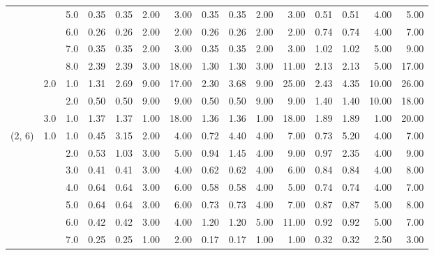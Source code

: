 \begin{tabular}{lllrrrrrrrrrrrr}
       &     & 5.0  &       0.35 &      0.35 & 2.00 &   3.00 &       0.35 &      0.35 &  2.00 &   3.00 &       0.51 &      0.51 &  4.00 &   5.00 \\
       &     & 6.0  &       0.26 &      0.26 & 2.00 &   2.00 &       0.26 &      0.26 &  2.00 &   2.00 &       0.74 &      0.74 &  4.00 &   7.00 \\
       &     & 7.0  &       0.35 &      0.35 & 2.00 &   3.00 &       0.35 &      0.35 &  2.00 &   3.00 &       1.02 &      1.02 &  5.00 &   9.00 \\
       &     & 8.0  &       2.39 &      2.39 & 3.00 &  18.00 &       1.30 &      1.30 &  3.00 &  11.00 &       2.13 &      2.13 &  5.00 &  17.00 \\
       & 2.0 & 1.0  &       1.31 &      2.69 & 9.00 &  17.00 &       2.30 &      3.68 &  9.00 &  25.00 &       2.43 &      4.35 & 10.00 &  26.00 \\
       &     & 2.0  &       0.50 &      0.50 & 9.00 &   9.00 &       0.50 &      0.50 &  9.00 &   9.00 &       1.40 &      1.40 & 10.00 &  18.00 \\
       & 3.0 & 1.0  &       1.37 &      1.37 & 1.00 &  18.00 &       1.36 &      1.36 &  1.00 &  18.00 &       1.89 &      1.89 &  1.00 &  20.00 \\
(2, 6) & 1.0 & 1.0  &       0.45 &      3.15 & 2.00 &   4.00 &       0.72 &      4.40 &  4.00 &   7.00 &       0.73 &      5.20 &  4.00 &   7.00 \\
       &     & 2.0  &       0.53 &      1.03 & 3.00 &   5.00 &       0.94 &      1.45 &  4.00 &   9.00 &       0.97 &      2.35 &  4.00 &   9.00 \\
       &     & 3.0  &       0.41 &      0.41 & 3.00 &   4.00 &       0.62 &      0.62 &  4.00 &   6.00 &       0.84 &      0.84 &  4.00 &   8.00 \\
       &     & 4.0  &       0.64 &      0.64 & 3.00 &   6.00 &       0.58 &      0.58 &  4.00 &   5.00 &       0.74 &      0.74 &  4.00 &   7.00 \\
       &     & 5.0  &       0.64 &      0.64 & 3.00 &   6.00 &       0.73 &      0.73 &  4.00 &   7.00 &       0.87 &      0.87 &  5.00 &   8.00 \\
       &     & 6.0  &       0.42 &      0.42 & 3.00 &   4.00 &       1.20 &      1.20 &  5.00 &  11.00 &       0.92 &      0.92 &  5.00 &   7.00 \\
       &     & 7.0  &       0.25 &      0.25 & 1.00 &   2.00 &       0.17 &      0.17 &  1.00 &   1.00 &       0.32 &      0.32 &  2.50 &   3.00 \\

\end{tabular}
